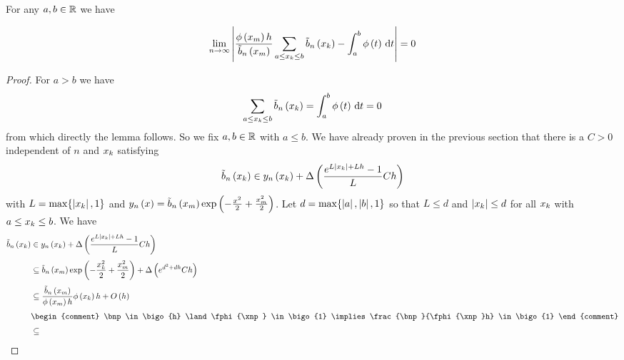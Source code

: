 \begin{lemma}
  For any $a,b \in \mathbb R$ we have

  \begin{align}
    \lim_{n\to\infty} \left|{\frac{\phi\left( {x_{m}} \right)h}{\tilde b_{n}\left({x_{m}}\right)} \sum_{a\le x_{k}\le b} \tilde b_{n}\left({x_{k}}\right) - \int_a^b \phi\left( {t} \right)\,\mathrm d{t}}\right| = 0
  \end{align}
\end{lemma}

\begin{proof}
  For $a > b$ we have
  \begin{align}
    \sum_{a\le x_{k} \le b}\tilde b_{n}\left({x_{k}}\right) = \int_a^b \phi\left( {t} \right)\,\mathrm d{t} = 0
  \end{align}
  from which directly the lemma follows. So we fix $a,b\in\mathbb R$ with $a\le b$. We have already proven in the previous section that there is a $C > 0$ independent of $n$ and $x_{k}$ satisfying
  \begin{align}
    \tilde b_{n}\left({x_{k}}\right) \in y_{n}\left({x_{k}}\right) + \Delta\left( {\frac{e^{L\left|{x_{k}}\right|+Lh}-1}L Ch} \right)
  \end{align}
  with $L = \max\{\left|{x_{k}}\right|,1\}$ and $y_{n}\left({x}\right) = \tilde b_{n}\left({x_{m}}\right)\exp\left( {-\frac{x^2}2+\frac{x_{m}^2}2} \right)$. Let $d = \max\{\left|{a}\right|,\left|{b}\right|, 1\}$ so that $L \le d$ and $\left|{x_{k}}\right| \le d$ for all $x_{k}$ with $a\le x_{k} \le b$. We have
  \begin{align}
    \bb{\x} & \in \phin{\x} + \bigabs{\frac{\fe{L\abs{\x}+Lh}-1}L Ch} \nl
    &\subseteq \bb{\xnp} \fexp{-\frac{\x^2}2+\frac{\xnp^2}2} + \bigabs{\fe{d^2+dh} C h} \nl
    &\subseteq \frac{\bnp}{\fphi{\xnp}h}  \fphi{\x}h + \bigo{h} \nl
    &
    \begin{comment}
      \bnp \in \bigo{h} \land \fphi{\xnp} \in \bigo{1} \implies \frac{\bnp}{\fphi{\xnp}h} \in \bigo{1}
    \end{comment} \nl
    & \subseteq
  \end{align}
\end{proof}
